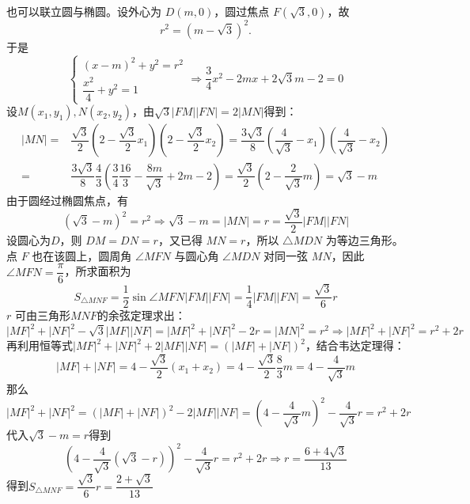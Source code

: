\begin{solution}
    也可以联立圆与椭圆。设外心为 $D(m,0)$，圆过焦点 $F(\sqrt3,0)$，故
    \[
    r^2=(m-\sqrt3)^2.
    \]
    于是
    \[\begin{cases}(x-m)^2+y^2=r^2\\\dfrac{x^2}{4}+y^2=1\end{cases}\Rightarrow \dfrac{3}{4}x^2-2mx+2\sqrt{3}m-2=0\]
    设$M(x_1,y_1),N(x_2,y_2)$，由$\sqrt{3}|FM||FN|=2|MN|$得到：
    \begin{align*}|MN|=&\dfrac{\sqrt3}{2}\left(2-\dfrac{\sqrt3}{2}x_1\right)\left(2-\dfrac{\sqrt3}{2}x_2\right)=\dfrac{3\sqrt3}{8}\left(\dfrac{4}{\sqrt3}-x_1\right)\left(\dfrac{4}{\sqrt3}-x_2\right)\\=&\dfrac{3\sqrt3}{8}\dfrac43\left(\dfrac{3}{4}\dfrac{16}{3}-\dfrac{8m}{\sqrt3}+2m-2\right)
    =\dfrac{\sqrt3}{2}(2-\dfrac{2}{\sqrt{3}}m)=\sqrt3-m\end{align*}
    由于圆经过椭圆焦点，有\[(\sqrt3-m)^2=r^2\Rightarrow \sqrt3-m=|MN|=r=\dfrac{\sqrt{3}}{2}|FM||FN|\]
    设圆心为$D$，则 $DM=DN=r$，又已得 $MN=r$，所以 $\triangle MDN$ 为等边三角形。点 $F$ 也在该圆上，圆周角 $\angle MFN$ 与圆心角 $\angle MDN$ 对同一弦 $MN$，因此 $\angle{MFN}=\dfrac{\pi}{6}$，所求面积为
    \[S_{\triangle{MNF}}=\dfrac12\sin\angle{MFN}|FM||FN|=\dfrac{1}{4}|FM||FN|=\dfrac{\sqrt3}{6}r\]
    $r$ 可由三角形$MNF$的余弦定理求出：
    \[|MF|^2+|NF|^2-\sqrt3|MF||NF|=|MF|^2+|NF|^2-2r=|MN|^2=r^2\Rightarrow |MF|^2+|NF|^2=r^2+2r\]
    再利用恒等式$|MF|^2+|NF|^2+2|MF||NF|=(|MF|+|NF|)^2$，结合韦达定理得：
    \[|MF|+|NF|=4-\dfrac{\sqrt3}{2}(x_1+x_2)=4-\dfrac{\sqrt3}{2}\dfrac{8}{3}m=4-\dfrac{4}{\sqrt3}m\]
    那么\[|MF|^2+|NF|^2=(|MF|+|NF|)^2-2|MF||NF|=(4-\dfrac{4}{\sqrt3}m)^2-\dfrac{4}{\sqrt3}r=r^2+2r\]
    代入$\sqrt3-m=r$得到\[\left(4-\dfrac{4}{\sqrt3}(\sqrt3-r)\right)^2-\dfrac{4}{\sqrt3}r=r^2+2r\Rightarrow r=\dfrac{6+4\sqrt3}{13}\]
    得到$S_{\triangle{MNF}}=\dfrac{\sqrt3}{6}r=\dfrac{2+\sqrt3}{13}$
\end{solution}

